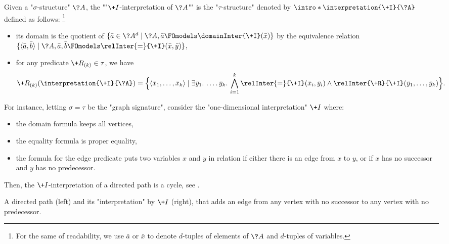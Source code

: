 Given a "$\sigma$-structure" $\?A$, the \AP""$\+I$-interpretation of $\?A$"" is the "$\tau$-structure" denoted by \AP$\intro*\interpretation{\+I}{\?A}$ defined as follows:%
\footnote{For the same of readability, we use $\bar a$ or $\bar x$ to
denote $d$-tuples of elements of $\?A$ and $d$-tuples of variables.}
\begin{itemize}
	\item its domain is the quotient of 
		$\{\bar a \in \?A^d \mid \?A, \bar a \FOmodels \domainInter{\+I}(\bar x)\}$
		by the equivalence relation
		$\set{\tup{\bar a, \bar b} \mid \?A, \bar a, \bar b \FOmodels \relInter{=}{\+I}(\bar x, \bar y)}$,
	\item for any predicate $\+R_{(k)} \in \tau$,
		we have
		\[
			\+R_{(k)}(\interpretation{\+I}{\?A}) =
			\Big\{\tup{\bar x_1, \hdots, \bar x_k} \mid
				\exists \bar y_1.\, \hdots.\, \bar y_k.\,
				\bigwedge_{i=1}^k \relInter{=}{\+I}(\bar x_i, \bar y_i)
				\land \relInter{\+R}{\+I}(\bar y_1, \hdots, \bar y_k)
			\Big\}.
		\]
\end{itemize}
For instance, letting $\sigma =\tau$ be the "graph signature", consider
the "one-dimensional interpretation" $\+I$ where:
\begin{itemize}
	\item the domain formula keeps all vertices,
	\item the equality formula is proper equality,
	\item the formula for the edge predicate puts two variables $x$ and $y$ in relation
		if either there is an edge from $x$ to $y$, or if $x$ has no successor and $y$ has no predecessor.
\end{itemize}
Then, the $\+I$-interpretation of a directed path is a cycle,
see .
\begin{marginfigure}
	\centering
	\qquad
	\caption{
		\AP\label{fig:interpretation-path-into-cycle}
		A directed path (left) and its "interpretation" by $\+I$ (right),
		that adds an edge from any vertex with no successor to any vertex with no predecessor.
	}
\end{marginfigure}

